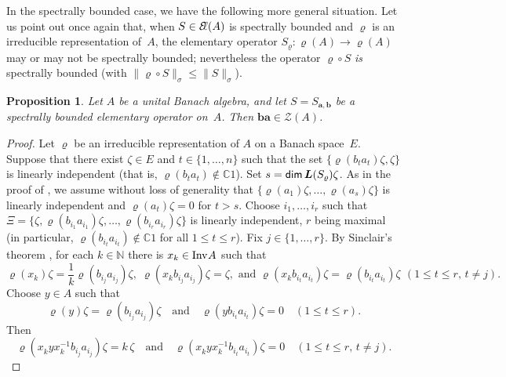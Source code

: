 \documentclass[a4paper,12pt,reqno]{amsart}
\numberwithin{equation}{section}
\newtheorem{prop}[thm]{Proposition}
\theoremstyle{definition}
\begin{document}
In the spectrally bounded case, we have the following more general situation.
Let us point out once again that, when $S\in{{\mathcal{E}\kern-2.6pt\ell(A)}}$ is spectrally bounded and $\varrho$ is an irreducible representation of~$A$,
the elementary operator $S_\varrho\colon \varrho(A)\to\varrho(A)$ may or may not be spectrally bounded;
nevertheless the operator $\varrho\circ S$ \textit{is\/} spectrally bounded (with ${{\|{{\varrho\circ S}}\|_\sigma}}\leq{{\|{S}\|_\sigma}}$).

\begin{prop}\label{tr-spb}
Let $A$ be a unital Banach algebra, and let  $S=S_{\bm a,\bm b}$ be a spectrally bounded elementary operator on~$A$.
Then $\bm b\bm a\in\mathcal Z (A)$.
\end{prop}
\begin{proof}
Let $\varrho$ be an irreducible  representation of $A$ on a  Banach space~$E$.
Suppose that there exist $\zeta\in E$ and $t\in\{1, \ldots, n\}$ such that the set $\{\varrho (b_t a_t) \zeta, \zeta\}$
is linearly independent (that is, $\varrho(b_t a_t)\notin{\mathbb{C}}1$).
Set $s={{\sf dim}\,}{{\bm L(S_\varrho)}}\zeta$.
As in the proof of \cite[Proposition~3.1]{NaMa13}, we assume without loss of generality that
$\{\varrho(a_1)\zeta, \ldots, \varrho(a_s)\zeta\}$ is linearly independent and $\varrho (a_t) \zeta=0$ for $t >s$.
Choose $i_1, \ldots, i_r$ such that $\Xi=\{\zeta,\varrho(b_{i_1}a_{i_1})\zeta,\ldots,\varrho(b_{i_r} a_{i_r})\zeta\}$ is linearly independent,
$r$ being maximal (in particular, $\varrho(b_{i_t}a_{i_t})\notin{\mathbb{C}}1$ for all $1\leq t\leq r$).
Fix $j \in \{1, \ldots, r\}$. By Sinclair's theorem \cite[Corollary~4.2.6]{Aup}, for each $k\in{\mathbb{N}}$ there is $x_k\in{{\textup{Inv}\kern.5pt A}}$ such that
\begin{equation*}
\varrho ( x_k ) \zeta= \frac{1}{k} \varrho( b_{i_j} a_{i_j}) \zeta,\;
\varrho( x_k b_{i_j} a_{i_j}) \zeta = \zeta, \text{ and }
\varrho (x_k b_{i_t} a_{i_t}) \zeta = \varrho (b_{i_t} a_{i_t}) \zeta \ \,(1\leq t\leq r,\,t \neq j).
\end{equation*}
Choose $y \in A$ such that
\begin{equation*}
\varrho( y) \zeta=\varrho ( b_{i_j} a_{i_j}) \zeta \quad \text{and} \quad \varrho (y b_{i_t} a_{i_t}) \zeta =0 \quad(1 \leq t \leq r).
\end{equation*}
Then
\begin{equation}\label{eq:eigenvalues}
\varrho (x_k^{} y x_k^{-1} b_{i_j} a_{i_j}) \zeta= k\,\zeta
\quad\text{and}\quad
\varrho( x_k^{} y x_k^{-1} b_{i_t} a_{i_t}) \zeta=0\quad(1\leq t\leq r,\,t \neq j).

\end{equation}
\end{proof}
\end{document}

